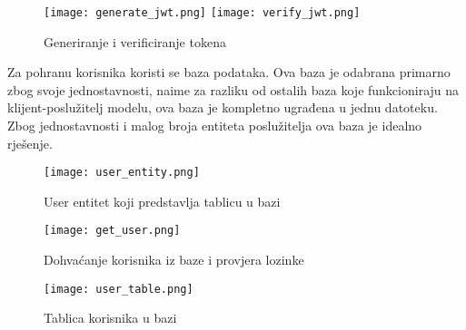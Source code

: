 \begin{figure}[h]
  \texttt{[image: generate\_jwt.png]}
  \texttt{[image: verify\_jwt.png]}
  \caption{Generiranje i verificiranje tokena}
\end{figure}

Za pohranu korisnika koristi se  baza podataka.
\paraBreak
Ova baza je odabrana primarno zbog svoje jednostavnosti, naime za razliku od ostalih baza koje funkcioniraju na
klijent-poslužitelj modelu, ova baza je kompletno ugrađena u jednu datoteku. \cite{SQLite} \\
Zbog jednostavnosti i malog broja entiteta poslužitelja ova baza je idealno rješenje.

\begin{figure}[h]
  \texttt{[image: user\_entity.png]}
  \caption{User entitet koji predstavlja tablicu u bazi}
\end{figure}

\begin{figure}[h]
  \texttt{[image: get\_user.png]}
  \caption{Dohvaćanje korisnika iz baze i provjera lozinke}
\end{figure}

\begin{figure}[h]
  \texttt{[image: user\_table.png]}
  \caption{Tablica korisnika u bazi}
\end{figure}

\clearpage
